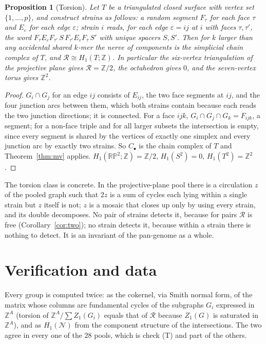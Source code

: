 \documentclass[11pt]{article}
\theoremstyle{plain}
\newtheorem{proposition}[theorem]{Proposition}
\theoremstyle{definition}
\theoremstyle{remark}
\newcommand{\Z}{\mathbb{Z}}
\newcommand{\Rec}{\mathcal{R}}
\newcommand{\Nerve}{\mathcal{N}}
\newcommand{\RP}{\mathbb{RP}^2}
\begin{document}
\begin{proposition}[Torsion]\label{prop:rp2}
Let $T$ be a triangulated closed surface with vertex set $\{1,\dots,p\}$, and construct
strains as follows: a random segment $F_\tau$ for each face $\tau$ and $E_\varepsilon$ for
each edge $\varepsilon$; strain $i$ reads, for each edge $\varepsilon=ij$ at $i$ with faces
$\tau,\tau'$, the word $F_\tau E_\varepsilon F_{\tau'}\,S\,F_{\tau'}E_\varepsilon F_\tau\,S'$
with unique spacers $S,S'$. Then for $k$ larger than any accidental shared $k$-mer the nerve
of components is the simplicial chain complex of $T$, and $\Rec\cong H_1(T;\Z)$. In
particular the six-vertex triangulation of the projective plane gives $\Rec=\Z/2$, the
octahedron gives $0$, and the seven-vertex torus gives $\Z^2$.
\end{proposition}

\begin{proof}
$G_i\cap G_j$ for an edge $ij$ consists of $E_{ij}$, the two face segments at $ij$, and the
four junction arcs between them, which both strains contain because each reads the two
junction directions; it is connected. For a face $ijk$, $G_i\cap G_j\cap G_k=F_{ijk}$, a
segment; for a non-face triple and for all larger subsets the intersection is empty, since
every segment is shared by the vertices of exactly one simplex and every junction arc by
exactly two strains. So $C_\bullet$ is the chain complex of $T$ and Theorem~\ref{thm:mv}
applies. $H_1(\RP;\Z)=\Z/2$, $H_1(S^2)=0$, $H_1(T^2)=\Z^2$.
\end{proof}

The torsion class is concrete. In the projective-plane pool there is a circulation $z$ of the
pooled graph such that $2z$ is a sum of cycles each lying within a single strain but $z$
itself is not; $z$ is a mosaic that closes up only by using every strain, and its double
decomposes. No pair of strains detects it, because for pairs $\Rec$ is free
(Corollary~\ref{cor:two}); no strain detects it, because within a strain there is nothing to
detect. It is an invariant of the pan-genome as a whole.

\section{Verification and data}\label{sec:data}

Every group is computed twice: as the cokernel, via Smith normal form, of the matrix whose
columns are fundamental cycles of the subgraphs $G_i$ expressed in $\Z^A$ (torsion of
$\Z^A/\sum Z_1(G_i)$ equals that of $\Rec$ because $Z_1(G)$ is saturated in $\Z^A$), and as
$H_1(\Nerve)$ from the component structure of the intersections. The two agree in every one
of the $28$ pools, which is check (T) and part of the others.
\end{document}

